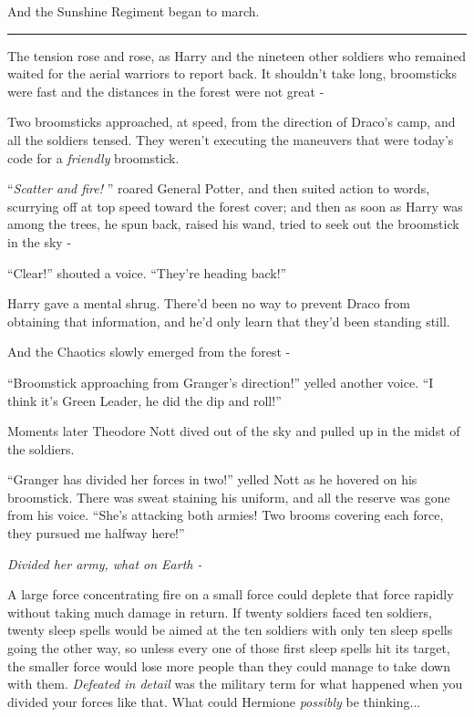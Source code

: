 And the Sunshine Regiment began to march.

\begin{center}\rule{3in}{0.4pt}\end{center}

The tension rose and rose, as Harry and the nineteen other soldiers who
remained waited for the aerial warriors to report back. It shouldn't
take long, broomsticks were fast and the distances in the forest were
not great -

Two broomsticks approached, at speed, from the direction of Draco's
camp, and all the soldiers tensed. They weren't executing the maneuvers
that were today's code for a \emph{friendly} broomstick.

``\emph{Scatter and fire!} '' roared General Potter, and then suited
action to words, scurrying off at top speed toward the forest cover; and
then as soon as Harry was among the trees, he spun back, raised his
wand, tried to seek out the broomstick in the sky -

``Clear!'' shouted a voice. ``They're heading back!''

Harry gave a mental shrug. There'd been no way to prevent Draco from
obtaining that information, and he'd only learn that they'd been
standing still.

And the Chaotics slowly emerged from the forest -

``Broomstick approaching from Granger's direction!'' yelled another
voice. ``I think it's Green Leader, he did the dip and roll!''

Moments later Theodore Nott dived out of the sky and pulled up in the
midst of the soldiers.

``Granger has divided her forces in two!'' yelled Nott as he hovered on
his broomstick. There was sweat staining his uniform, and all the
reserve was gone from his voice. ``She's attacking both armies! Two
brooms covering each force, they pursued me halfway here!''

\emph{Divided her army, what on Earth -}

A large force concentrating fire on a small force could deplete that
force rapidly without taking much damage in return. If twenty soldiers
faced ten soldiers, twenty sleep spells would be aimed at the ten
soldiers with only ten sleep spells going the other way, so unless every
one of those first sleep spells hit its target, the smaller force would
lose more people than they could manage to take down with them.
\emph{Defeated in detail} was the military term for what happened when
you divided your forces like that. What could Hermione \emph{possibly}
be thinking...

